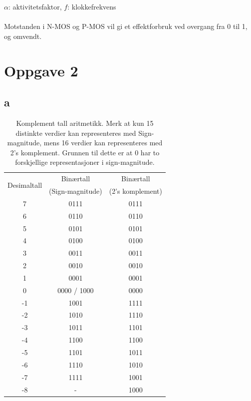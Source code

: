 \documentclass[12pt,norsk,a4paper]{article}
\begin{document}
$\alpha$: aktivitetsfaktor, $f$: klokkefrekvens \\
\\
Motstanden i N-MOS og P-MOS vil gi et effektforbruk ved overgang fra 0 til 1, og omvendt.

\section{Oppgave 2}
\subsection{a}
\begin{table}[H]
\begin{center}
    \begin{tabular}{ |c|c|c| }
    \hline
    \multirow{2}{*}{Desimaltall} & Binærtall & Binærtall\\
    & (Sign-magnitude) & (2's komplement) \\ \hline
    7   & 0111          &  0111\\ \hline
    6   & 0110          &  0110\\ \hline
    5   & 0101          &  0101\\ \hline
    4   & 0100          &  0100\\ \hline
    3   & 0011          &  0011\\ \hline
    2   & 0010          &  0010\\ \hline
    1   & 0001          &  0001\\ \hline
    0   & 0000 / 1000   &  0000\\ \hline
    -1  & 1001          &  1111\\ \hline
    -2  & 1010          &  1110\\ \hline
    -3  & 1011          &  1101\\ \hline
    -4  & 1100          &  1100\\ \hline
    -5  & 1101          &  1011\\ \hline
    -6  & 1110          &  1010\\ \hline
    -7  & 1111          &  1001\\ \hline
    -8  & -             &  1000\\ \hline
    
    \end{tabular}
    \end{center}
    \caption{Komplement tall aritmetikk. Merk at kun 15 distinkte verdier kan representeres med Sign-magnitude, mens 16 verdier kan representeres med 2's komplement. Grunnen til dette er at 0 har to forskjellige representasjoner i sign-magnitude.}
\end{table}
\end{document}

